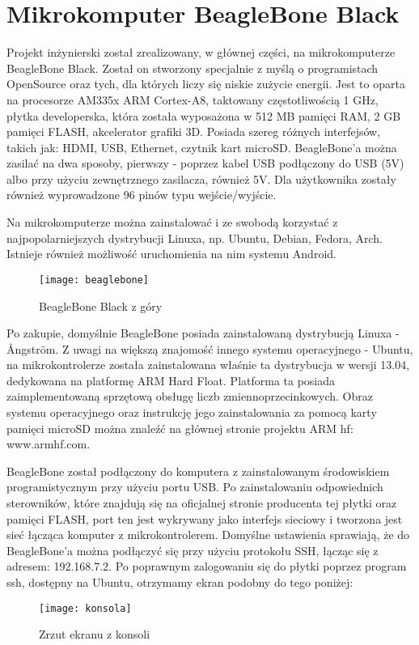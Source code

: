 \chapter{Mikrokomputer BeagleBone Black}
Projekt inżynierski został zrealizowany, w głównej części, na mikrokomputerze BeagleBone Black. Został on stworzony specjalnie z myślą o programistach OpenSource oraz tych, dla których liczy się niskie zużycie energii. Jest to oparta na procesorze AM335x ARM Cortex-A8, taktowany częstotliwością 1 GHz, płytka developerska, która została wyposażona w 512 MB pamięci RAM, 2 GB pamięci FLASH, akcelerator grafiki 3D. Posiada szereg różnych interfejsów, takich jak: HDMI, USB, Ethernet, czytnik kart microSD. BeagleBone'a można zasilać na dwa sposoby, pierwszy - poprzez kabel USB podłączony do USB (5V) albo przy użyciu zewnętrznego zasilacza, również 5V. Dla użytkownika zostały również wyprowadzone 96 pinów typu wejście/wyjście.

Na mikrokomputerze można zainstalować i ze swobodą korzystać z najpopolarniejszych dystrybucji Linuxa, np. Ubuntu, Debian, Fedora, Arch. Istnieje również możliwość uruchomienia na nim systemu Android.

\begin{figure}[h]
\centering
\texttt{[image: beaglebone]}
\caption{BeagleBone Black z góry}
\label{fig:beaglebone}
\end{figure}

Po zakupie, domyślnie BeagleBone posiada zainstalowaną dystrybucją Linuxa - Ångström. Z uwagi na większą znajomość innego systemu operacyjnego - Ubuntu, na mikrokontrolerze została zainstalowana właśnie ta dystrybucja w wersji 13.04, dedykowana na platformę ARM Hard Float. Platforma ta posiada zaimplementowaną sprzętową obsługę liczb zmiennoprzecinkowych. Obraz systemu operacyjnego oraz instrukcję jego zainstalowania za pomocą karty pamięci microSD można znaleźć na głównej stronie projektu ARM hf: www.armhf.com.

BeagleBone został podłączony do komputera z zainstalowanym środowiskiem programistycznym przy użyciu portu USB. Po zainstalowaniu odpowiednich sterowników, które znajdują się na oficjalnej stronie producenta tej płytki oraz pamięci FLASH, port ten jest wykrywany jako interfejs sieciowy i tworzona jest sieć łącząca komputer z mikrokontrolerem. Domyślne ustawienia sprawiają, że do BeagleBone'a można podłączyć się przy użyciu protokołu SSH, łącząc się z adresem: 192.168.7.2. Po poprawnym zalogowaniu się do płytki poprzez program ssh, dostępny na Ubuntu, otrzymamy ekran podobny do tego poniżej:

\begin{figure}[h]
\centering
\texttt{[image: konsola]}
\caption{Zrzut ekranu z konsoli}
\label{fig:konsola}
\end{figure}
